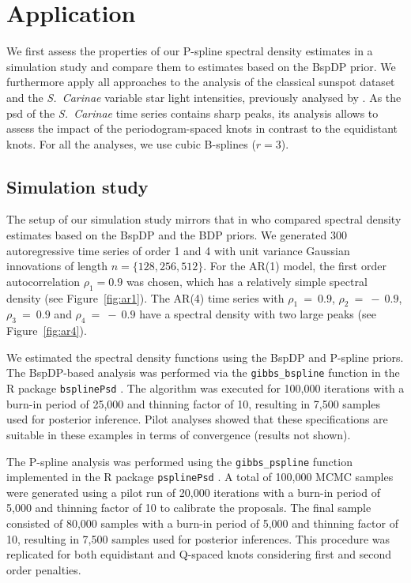 \documentclass[twocolumn,final]{svjour3}
\begin{document}

\section{Application}
\label{sec:application}

We first assess the properties of our P-spline spectral density estimates in a simulation study and compare them to estimates based on the BspDP prior. We furthermore apply all approaches to the
analysis of the classical sunspot dataset  and the {\it S.\ Carinae} variable star light intensities, previously analysed by \cite{Cart:1997,Huerta:1999,Kirch:2018}.  As the psd of the  {\it S.\ Carinae} time series contains sharp peaks, its analysis allows to assess the impact of the periodogram-spaced knots in contrast to the equidistant knots.   For all the analyses, we use cubic B-splines ($r=3$).

\subsection{Simulation study}

The setup of our simulation study mirrors that  in \cite{Edwards2019} who  compared spectral density estimates based on the BspDP and the BDP priors. 
We generated  300  autoregressive time series of order 1 and 4 with unit variance Gaussian innovations of length $n = \{128, 256, 512\}$.
For the AR(1) model, the  first  order autocorrelation $\rho_1 = 0.9$ was chosen, which has a relatively simple spectral density (see Figure~\ref{fig:ar1}).  The AR(4) time series with $\rho_1~=~0.9$, $\rho_2~=~-~0.9$, $\rho_3~=~0.9$ and $\rho_4~=~-~0.9$ have a spectral density with two large peaks (see Figure~\ref{fig:ar4}).  

We estimated the spectral density functions using the BspDP and P-spline priors.  The BspDP-based  analysis was performed via the \texttt{gibbs\_bspline} function in the \textsf{R} package \texttt{bsplinePsd} \cite{Edwards:bsplinePsd:2018}.  The algorithm was executed for 100,000 iterations with a burn-in period of 25,000 and thinning factor of 10, resulting in 7,500 samples used for posterior inference.  Pilot analyses showed that these specifications are suitable in these examples in terms of convergence (results not shown).  

The P-spline analysis was performed using the \texttt{gibbs\_pspline} function implemented in the \textsf{R} package \texttt{psplinePsd} \citep{psplinepackage}.  A total of 100,000 MCMC samples were generated
using  a pilot run of 20,000 iterations with a burn-in period of 5,000 and thinning factor of 10 to calibrate the proposals.  The final sample consisted of 80,000 samples with a burn-in period of 5,000 and thinning factor of 10, resulting in 7,500 samples used for posterior inferences.  
This procedure was replicated for both equidistant and Q-spaced knots considering first and second order penalties.
\end{document}
